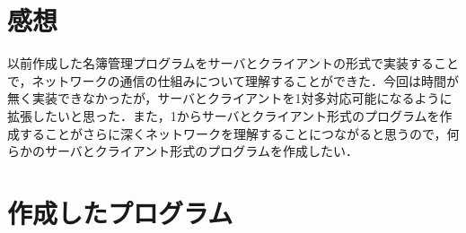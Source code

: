 \documentclass{jarticle}[11pt]
\begin{document}
\section{感想}
以前作成した名簿管理プログラムをサーバとクライアントの形式で実装することで，ネットワークの通信の仕組みについて理解することができた．今回は時間が無く実装できなかったが，サーバとクライアントを1対多対応可能になるように拡張したいと思った．また，1からサーバとクライアント形式のプログラムを作成することがさらに深くネットワークを理解することにつながると思うので，何らかのサーバとクライアント形式のプログラムを作成したい．


    \section{作成したプログラム}
\end{document}
